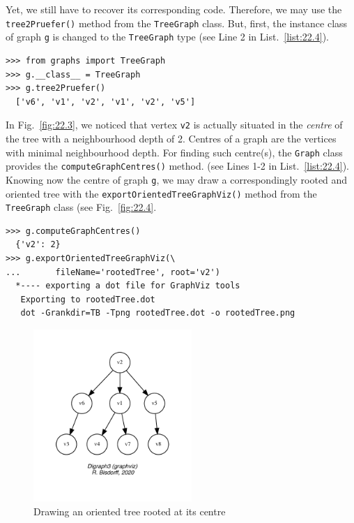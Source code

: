 Yet, we still have to recover its corresponding \Pruefer code. Therefore, we may use the \texttt{tree2Pruefer()} method  from the \texttt{TreeGraph} class. But, first, the instance class of graph \texttt{g} is changed to the \texttt{TreeGraph} type (see Line 2 in List.~\vref{list:22.4}). 
\begin{lstlisting}[caption={Computing the \Pruefer code of a tree graph instance.},label=list:22.4]
>>> from graphs import TreeGraph
>>> g.__class__ = TreeGraph  
>>> g.tree2Pruefer()
  ['v6', 'v1', 'v2', 'v1', 'v2', 'v5']
\end{lstlisting}

In Fig.~\vref{fig:22.3}, we noticed that vertex \texttt{v2} is actually situated in the \emph{centre} of the tree with a neighbourhood depth of 2. Centres of a graph are the vertices with minimal neighbourhood depth. For finding such centre(s), the \texttt{Graph} class provides the \texttt{computeGraphCentres()} method. (see Lines 1-2 in List.~\vref{list:22.4}). Knowing now the centre of graph \texttt{g}, we may draw a correspondingly rooted and oriented tree with the \texttt{exportOrientedTreeGraphViz()} method from the \texttt{TreeGraph} class (see Fig.~\vref{fig:22.4}.  
\begin{lstlisting}[caption={Computing the centres of a tree and drawing a rooted and oriented tree.},label=list:22.5]
>>> g.computeGraphCentres()
  {'v2': 2}
>>> g.exportOrientedTreeGraphViz(\
...       fileName='rootedTree', root='v2')
  *---- exporting a dot file for GraphViz tools
   Exporting to rootedTree.dot
   dot -Grankdir=TB -Tpng rootedTree.dot -o rootedTree.png
\end{lstlisting}
\begin{figure}[ht]
\sidecaption[t]
\includegraphics[width=6cm]{Figures/22-4-rootedTree.pdf}
\caption{Drawing an oriented tree rooted at its centre} 
\label{fig:22.4}       %
\end{figure}

